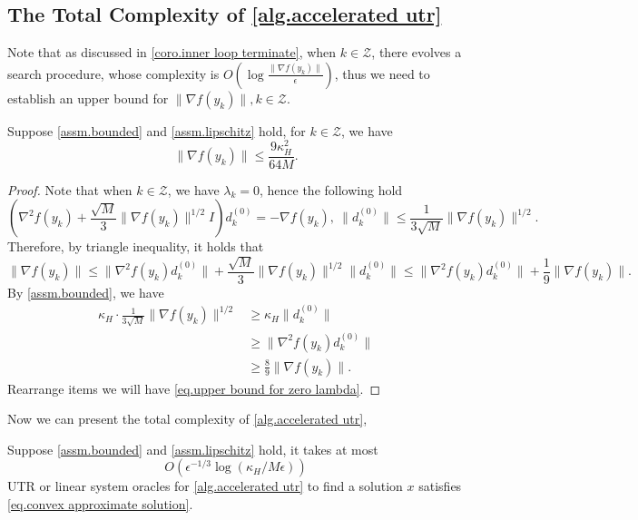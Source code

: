 \documentclass{article}
\begin{document}
\subsection{The Total Complexity of \autoref{alg.accelerated utr}}
Note that as discussed in \autoref{coro.inner loop terminate}, when $k\in \mathcal{Z}$, there evolves a search procedure, whose complexity is $O(\log \frac{\|\nabla f(y_k)\|}{\epsilon})$, thus we need to establish an upper bound for $\| \nabla f(y_k)\|, k\in \mathcal{Z}$.
\begin{lemma}
    \label{lem.upper bound for zero lambda}
    Suppose \autoref{assm.bounded} and \autoref{assm.lipschitz} hold, for $k\in \mathcal{Z}$, we have 
    \begin{equation}
        \label{eq.upper bound for zero lambda}
        \|\nabla f(y_k)\|\leq \frac{9\kappa_H^2}{64M}.
    \end{equation}
\end{lemma}
\begin{proof}
    Note that when $k\in \mathcal{Z}$, we have $\lambda_k =0$, hence the following hold
    \begin{equation*}
        \left (\nabla^2 f(y_k)+\frac{\sqrt{M}}{3}\|\nabla f(y_k)\|^{1/2} I\right )d_k^{(0)} = -\nabla f(y_k), \ \|d_k^{(0)}\| \leq \frac{1}{3\sqrt{M}}\|\nabla f(y_k)\|^{1/2}.
    \end{equation*}
    Therefore, by triangle inequality, it holds that
    \begin{equation*}
        \|\nabla f(y_k)\| \leq \|\nabla^2 f(y_k) d_k^{(0)}\| +\frac{\sqrt{M}}{3}\|\nabla f(y_k)\|^{1/2}\|d_k^{(0)}\| \leq \|\nabla^2 f(y_k) d_k^{(0)}\|+\frac{1}{9}\|\nabla f(y_k)\|.
    \end{equation*}
    By \autoref{assm.bounded}, we have 
    \begin{equation*}
        \begin{aligned}
            \kappa_H \cdot \frac{1}{3\sqrt{M}}\|\nabla f(y_k)\|^{1/2} &\geq \kappa_H \|d_k^{(0)}\| \\
            & \geq \|\nabla^2 f(y_k) d_k^{(0)}\|\\
            & \geq \frac{8}{9}\|\nabla f(y_k)\|.
        \end{aligned}
    \end{equation*}
    Rearrange items we will have \eqref{eq.upper bound for zero lambda}.
\end{proof}
Now we can present the total complexity of \autoref{alg.accelerated utr}, 
\begin{theorem}
    \label{thm.total complexity newton}
    Suppose \autoref{assm.bounded} and \autoref{assm.lipschitz} hold, it takes at most 
    \begin{equation}\label{eq.total complexity newton}
        O\left (\epsilon^{-1/3}\log \left(\kappa_H/M\epsilon\right)\right)
    \end{equation}
    UTR or linear system oracles for \autoref{alg.accelerated utr} to find a solution $x$ satisfies \eqref{eq.convex approximate solution}. 
\end{theorem}
\end{document}
